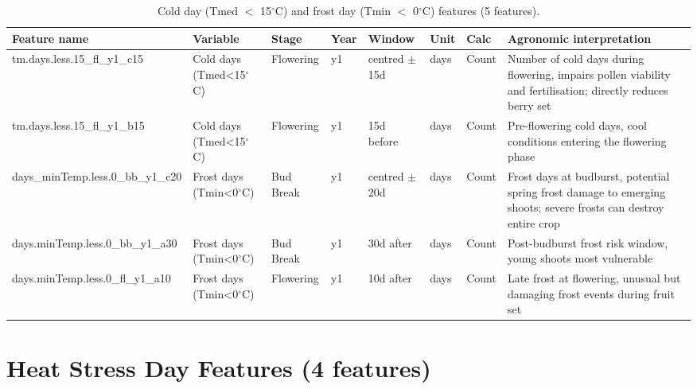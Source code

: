 \begin{table}[htbp]
  \centering
  \caption{Cold day (Tmed $<$ 15$^\circ$C) and frost day (Tmin $<$ 0$^\circ$C) features (5 features).}\label{tab:appc_2}
  \footnotesize
  \setlength{\tabcolsep}{4pt}
  \begin{adjustbox}{max width=\textwidth}
    \begin{tabularx}{\textwidth}{p{2.4cm}|p{1.7cm}|p{1.4cm}|p{0.5cm}|p{1.6cm}|p{0.8cm}|p{1.1cm}|X}
  \toprule
  Feature name & Variable & Stage & Year & Window & Unit & Calc & Agronomic interpretation \\
  \midrule
  tm.days.less.15\_fl\_y1\_c15 & Cold days (Tmed<15$^\circ$C) & Flowering & y1 & centred $\pm$15d & days & Count & Number of cold days during flowering, impairs pollen viability and fertilisation; directly reduces berry set \\
  tm.days.less.15\_fl\_y1\_b15 & Cold days (Tmed<15$^\circ$C) & Flowering & y1 & 15d before & days & Count & Pre-flowering cold days, cool conditions entering the flowering phase \\
  days\_minTemp.less.0\_bb\_y1\_c20 & Frost days (Tmin<0$^\circ$C) & Bud Break & y1 & centred $\pm$20d & days & Count & Frost days at budburst, potential spring frost damage to emerging shoots; severe frosts can destroy entire crop \\
  days.minTemp.less.0\_bb\_y1\_a30 & Frost days (Tmin<0$^\circ$C) & Bud Break & y1 & 30d after & days & Count & Post-budburst frost risk window, young shoots most vulnerable \\
  days.minTemp.less.0\_fl\_y1\_a10 & Frost days (Tmin<0$^\circ$C) & Flowering & y1 & 10d after & days & Count & Late frost at flowering, unusual but damaging frost events during fruit set \\
  \bottomrule
\end{tabularx}
  \end{adjustbox}

\end{table}



\section{Heat Stress Day Features (4 features)}\label{app_sec:heat_stress_day_features}

